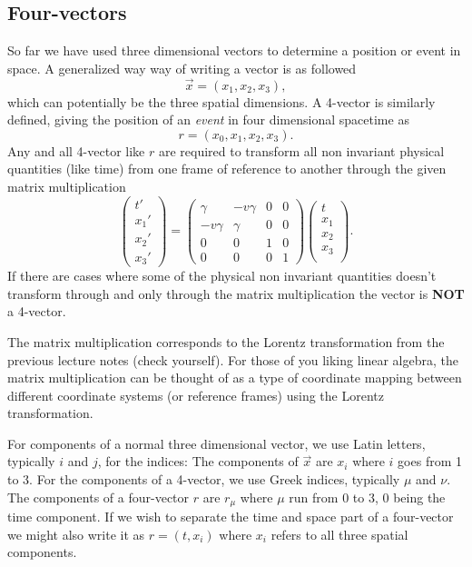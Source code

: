 {\begin{multicols}{2}
\section{Four-vectors}
\label{sect:fourvectors}

So far we have used three dimensional vectors to determine a position or event in space. A generalized way way of writing a vector is as followed
\[
\vec{x}=(x_1,x_2,x_3),
\]
which can potentially be the three spatial dimensions. A 4-vector is similarly defined, giving the position of an \emph{event} in four dimensional spacetime as
\[
r=(x_0,x_1,x_2,x_3).
\]
Any and all 4-vector like $r$ are required to transform all non invariant physical quantities (like time) from one frame of reference to another through the given matrix multiplication
\[
\begin{pmatrix}
t' \\
x_1' \\
x_2' \\
x_3'  
\end{pmatrix}
=
\begin{pmatrix}
\gamma&-v\gamma&0&0\\
-v\gamma&\gamma&0&0\\
0&0&1&0\\
0&0&0&1
\end{pmatrix}
\begin{pmatrix}
t \\
x_1 \\
x_2 \\
x_3 \\
\end{pmatrix}.
\]
If there are cases where some of the physical non invariant quantities doesn't transform through and only through the matrix multiplication the vector is \textbf{NOT} a 4-vector.

The matrix multiplication corresponds to the Lorentz transformation from the previous lecture notes (check yourself). For those of you liking linear algebra, the matrix multiplication can be thought of as a type of coordinate mapping between different coordinate systems (or reference frames) using the Lorentz transformation.

For components of a normal three dimensional vector, we use Latin letters, typically $i$ and $j$,  for the indices: The components of $\vec{x}$ are $x_i$ where $i$ goes from 1 to 3. For the components of a 4-vector, we use Greek indices, typically $\mu$ and $\nu$. The components of a four-vector $r$ are $r_\mu$ where $\mu$ run from 0 to 3, 0 being the time component. If we wish to separate the time and space part of a four-vector we might also write it as $r=(t,x_i)$ where $x_i$ refers to all three spatial components.


\end{multicols}}
